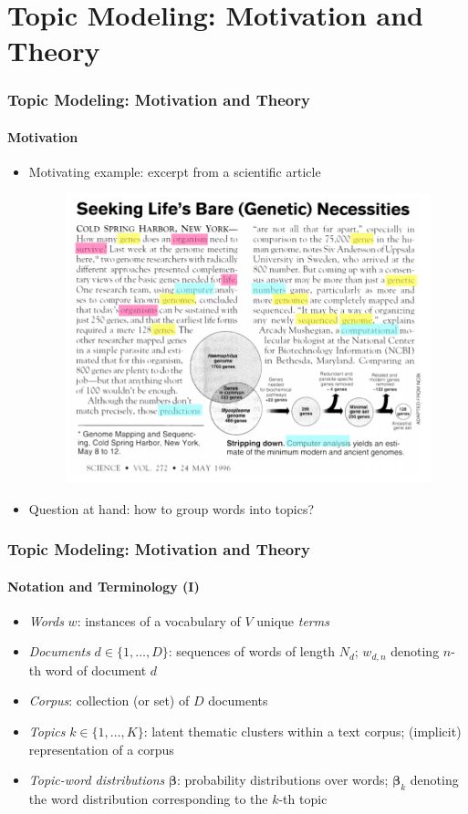 \documentclass[xcolor=dvipsnames]{beamer}
\begin{document}
\section{Topic Modeling: Motivation and Theory}
\begin{frame}
\frametitle{Topic Modeling: Motivation and Theory}
\framesubtitle{Motivation}
\begin{itemize}
\item Motivating example: excerpt from a scientific article \parencite{blei2012presentation}
	\begin{figure}[h!]
  	\centering
  	\includegraphics[scale = 0.30]{../plots/presentation/motivation.png}
	\end{figure}
\item Question at hand: how to group words into topics?
\end{itemize}
\end{frame}

\begin{frame}
\frametitle{Topic Modeling: Motivation and Theory}
\framesubtitle{Notation and Terminology (I)}
\begin{itemize}
\item \textit{Words} $w$: instances of a vocabulary of $V$ unique \textit{terms}
\item \textit{Documents} $d \in \{1,\dots,D\}$: sequences of words of length $N_{d}$; $w_{d,n}$ denoting $n$-th word of document $d$
\item \textit{Corpus}: collection (or set) of $D$ documents
\item \textit{Topics} $k \in \{1,\dots,K\}$: latent thematic clusters within a text corpus; (implicit) representation of a corpus
\item \textit{Topic-word distributions} $\boldsymbol{\beta}$: probability distributions over words; $\boldsymbol{\beta}_k$ denoting the word distribution corresponding to the $k$-th topic
\end{itemize}
\end{frame}
\end{document}
